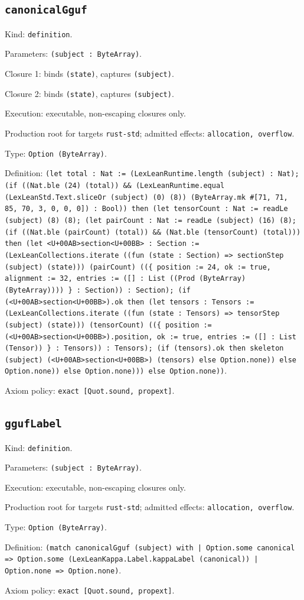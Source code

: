 \documentclass[11pt]{article}
\begin{document}
\subsection*{\texttt{canonicalGguf}}
\noindent Kind: \texttt{definition}.\par
\noindent Parameters: \texttt{(subject : ByteArray)}.\par
\noindent Closure 1: binds \texttt{(state)}, captures \texttt{(subject)}.\par
\noindent Closure 2: binds \texttt{(state)}, captures \texttt{(subject)}.\par
\noindent Execution: executable, non-escaping closures only.\par
\noindent Production root for targets \texttt{rust-std}; admitted effects: \texttt{allocation, overflow}.\par
\noindent Type: \texttt{Option (ByteArray)}.\par
\noindent Definition: \texttt{(let total : Nat := (LexLeanRuntime.length (subject) : Nat); (if ((Nat.ble (24) (total)) \&\& (LexLeanRuntime.equal (LexLeanStd.Text.sliceOr (subject) (0) (8)) (ByteArray.mk \#[71, 71, 85, 70, 3, 0, 0, 0]) : Bool)) then (let tensorCount : Nat := readLe (subject) (8) (8); (let pairCount : Nat := readLe (subject) (16) (8); (if ((Nat.ble (pairCount) (total)) \&\& (Nat.ble (tensorCount) (total))) then (let <U+00AB>section<U+00BB> : Section := (LexLeanCollections.iterate ((fun (state : Section) => sectionStep (subject) (state))) (pairCount) ((\{ position := 24, ok := true, alignment := 32, entries := ([] : List ((Prod (ByteArray) (ByteArray)))) \} : Section)) : Section); (if (<U+00AB>section<U+00BB>).ok then (let tensors : Tensors := (LexLeanCollections.iterate ((fun (state : Tensors) => tensorStep (subject) (state))) (tensorCount) ((\{ position := (<U+00AB>section<U+00BB>).position, ok := true, entries := ([] : List (Tensor)) \} : Tensors)) : Tensors); (if (tensors).ok then skeleton (subject) (<U+00AB>section<U+00BB>) (tensors) else Option.none)) else Option.none)) else Option.none))) else Option.none))}.\par
\noindent Axiom policy: \texttt{exact [Quot.sound, propext]}.\par
\subsection*{\texttt{ggufLabel}}
\noindent Kind: \texttt{definition}.\par
\noindent Parameters: \texttt{(subject : ByteArray)}.\par
\noindent Execution: executable, non-escaping closures only.\par
\noindent Production root for targets \texttt{rust-std}; admitted effects: \texttt{allocation, overflow}.\par
\noindent Type: \texttt{Option (ByteArray)}.\par
\noindent Definition: \texttt{(match canonicalGguf (subject) with | Option.some canonical => Option.some (LexLeanKappa.Label.kappaLabel (canonical)) | Option.none => Option.none)}.\par
\noindent Axiom policy: \texttt{exact [Quot.sound, propext]}.\par
\end{document}
